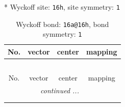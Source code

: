 \documentclass[fleqn,8pt]{jsarticle}
\begin{document}
* Wyckoff site: {\tt 16h}, site symmetry: {\tt 1}
\renewcommand{\arraystretch}{1.2}
\begin{longtable}{cccc}
\caption{Wyckoff bond: {\tt 16a@16h}, bond symmetry: {\tt 1}}
 \\
 \hline \hline
No. & vector & center & mapping \\ \hline \endfirsthead

\multicolumn{3}{l}{\tablename\ \thetable{}} \\
 \hline \hline
No. & vector & center & mapping \\ \hline \endhead

 \hline \hline
\multicolumn{3}{r}{\footnotesize\it continued ...} \\ \endfoot

 \hline \hline
\multicolumn{3}{r}{} \\ \endlastfoot


\end{longtable}
\end{document}

